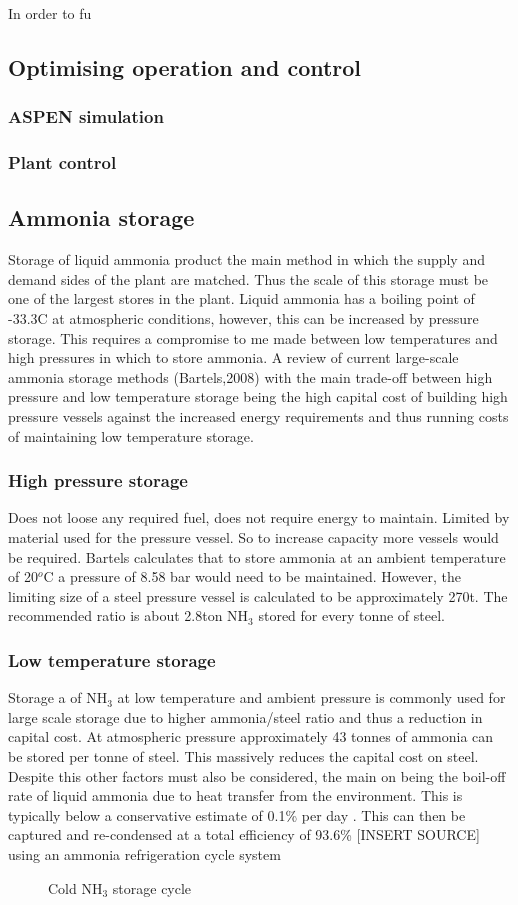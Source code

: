{In order to fu
\subsection{Optimising operation and control}
\subsubsection{ASPEN simulation}
\newpage
\subsubsection{Plant control}
\newpage


\subsection{Ammonia storage}
Storage of liquid ammonia product the main method in which the supply and demand sides of the plant are matched. Thus the scale of this storage must be one of the largest stores in the plant. Liquid ammonia has a boiling point of -33.3\textdegree C at atmospheric conditions, however, this can be increased by pressure storage. This requires a compromise to me made between low temperatures and high pressures in which to store ammonia. A review of current large-scale ammonia storage methods (Bartels,2008)\cite{Bartels2008} with the main trade-off between high pressure and low temperature storage being the high capital cost of building high pressure vessels against the increased energy requirements and thus running costs of maintaining low temperature storage. 
\subsubsection{High pressure storage}
Does not loose any required fuel, does not require energy to maintain. Limited by material used for the pressure vessel. So to increase capacity more vessels would be required. Bartels calculates that to store ammonia at an ambient temperature of 20$^o$C a pressure of 8.58 bar would need to be maintained. However, the limiting size of a steel pressure vessel is calculated to be approximately 270t. The recommended ratio is about 2.8ton NH$_3$ stored for every tonne of steel. 
\subsubsection{Low temperature storage}
Storage a of NH$_3$ at low temperature and ambient pressure is commonly used for large scale storage due to higher ammonia/steel ratio and thus a reduction in capital cost. At atmospheric pressure approximately 43 tonnes of ammonia can be stored per tonne of steel. This massively reduces the capital cost on steel. Despite this other factors must also be considered, the main on being the boil-off rate of liquid ammonia due to heat transfer from the environment. This is typically below a conservative estimate of 0.1\% per day \cite{Belapurkar2016}. This can then be captured and re-condensed at a total efficiency of 93.6\% [INSERT SOURCE] using an ammonia refrigeration cycle system 
{\begin{figure}[h]
		  \caption{Cold NH$_3$ storage cycle}
		

\end{figure}}}
